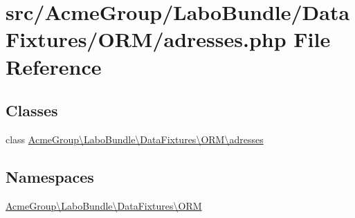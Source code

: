 \hypertarget{adresses_8php}{\section{src/\+Acme\+Group/\+Labo\+Bundle/\+Data\+Fixtures/\+O\+R\+M/adresses.php File Reference}
\label{adresses_8php}
}
\subsection*{Classes}
\begin{DoxyCompactItemize}
\item 
class \hyperlink{class_acme_group_1_1_labo_bundle_1_1_data_fixtures_1_1_o_r_m_1_1adresses}{Acme\+Group\textbackslash{}\+Labo\+Bundle\textbackslash{}\+Data\+Fixtures\textbackslash{}\+O\+R\+M\textbackslash{}adresses}
\end{DoxyCompactItemize}
\subsection*{Namespaces}
\begin{DoxyCompactItemize}
\item 
 \hyperlink{namespace_acme_group_1_1_labo_bundle_1_1_data_fixtures_1_1_o_r_m}{Acme\+Group\textbackslash{}\+Labo\+Bundle\textbackslash{}\+Data\+Fixtures\textbackslash{}\+O\+R\+M}
\end{DoxyCompactItemize}
